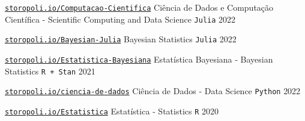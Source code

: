 

\begin{cventries}

  \cventry
    {\href{https://storopoli.io/Computacao-Cientifica/}{\texttt{storopoli.io/Computacao-Cientifica}}} %
    {Ciência de Dados e Computação Científica - Scientific Computing and Data Science} %
    {\texttt{Julia}} %
    {2022} %

  \cventry
    {\href{https://storopoli.io/Bayesian-Julia/}{\texttt{storopoli.io/Bayesian-Julia}}} %
    {Bayesian Statistics} %
    {\texttt{Julia}} %
    {2022} %

  \cventry
    {\href{https://storopoli.io/Estatistica-Bayesiana/}{\texttt{storopoli.io/Estatistica‑Bayesiana}}} %
    {Estatística Bayesiana ‑ Bayesian Statistics} %
    {\texttt{R + Stan}} %
    {2021} %

  \cventry
    {\href{https://storopoli.io/ciencia-de-dados}{\texttt{storopoli.io/ciencia-de-dados}}} %
    {Ciência de Dados ‑ Data Science} %
    {\texttt{Python}} %
    {2022} %

  \cventry
    {\href{https://storopoli.io/Estatistica/}{\texttt{storopoli.io/Estatistica}}} %
    {Estatística ‑ Statistics} %
    {\texttt{R}} %
    {2020} %

\end{cventries}
